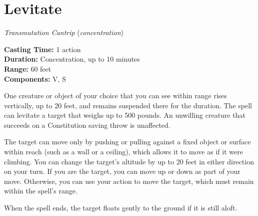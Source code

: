 \documentclass[twocolumn,lettersize]{article}
\begin{document}
  
    {
  

  \section*{Levitate}

    \textit{Transmutation Cantrip} %
    (\textit{concentration})%
             
  \noindent
  \textbf{Casting Time:} 1 action \\
  \textbf{Duration:} Concentration, up to 10 minutes\\
  \textbf{Range:} 60 feet \\
  \textbf{Components:} V, S 

  One creature or object of your choice that you can see within range rises 
    vertically, up to 20 feet, and remains suspended there for the duration. The 
    spell can levitate a target that weighs up to 500 pounds. An unwilling creature 
    that succeeds on a Constitution saving throw is unaffected.
    
    The target can move
     only by pushing or pulling against a fixed object or surface within reach (such
     as a wall or a ceiling), which allows it to move as if it were climbing. You 
    can change the target's altitude by up to 20 feet in either direction on your 
    turn. If you are the target, you can move up or down as part of your move. 
    Otherwise, you can use your action to move the target, which must remain within 
    the spell's range.
    
    When the spell ends, the target floats gently to the ground 
    if it is still aloft.
    

  } %
\end{document}
